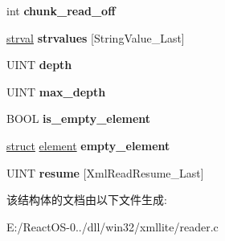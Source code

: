 \begin{DoxyCompactItemize}
int {\bfseries chunk\+\_\+read\+\_\+off}
\item 
\mbox{\label{structxmlreader_a3ca4dadbf0df41347d060e5d47f81cc0}} 
\hyperlink{structstrval}{strval} {\bfseries strvalues} \mbox{[}String\+Value\+\_\+\+Last\mbox{]}
\item 
\mbox{\label{structxmlreader_af38081efc9577da878b98a98f0c2ec78}} 
U\+I\+NT {\bfseries depth}
\item 
\mbox{\label{structxmlreader_aed5e9822da0a6f4a574199f01b55f54e}} 
U\+I\+NT {\bfseries max\+\_\+depth}
\item 
\mbox{\label{structxmlreader_a87e11cb9af424488d8e932afba5af602}} 
B\+O\+OL {\bfseries is\+\_\+empty\+\_\+element}
\item 
\mbox{\label{structxmlreader_a554fc8831481f3ac9be2de15e70478be}} 
\hyperlink{interfacestruct}{struct} \hyperlink{structelement}{element} {\bfseries empty\+\_\+element}
\item 
\mbox{\label{structxmlreader_a347ecc36425e3e53cf154470d2291d56}} 
U\+I\+NT {\bfseries resume} \mbox{[}Xml\+Read\+Resume\+\_\+\+Last\mbox{]}
\end{DoxyCompactItemize}


该结构体的文档由以下文件生成\+:\begin{DoxyCompactItemize}
\item 
E\+:/\+React\+O\+S-\/0../dll/win32/xmllite/reader.\+c\end{DoxyCompactItemize}
